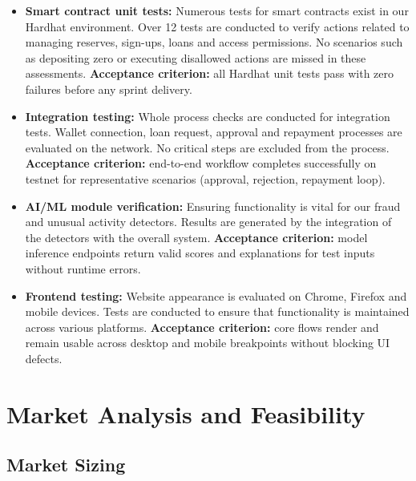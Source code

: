 \documentclass[12pt,a4paper]{report}
\begin{document}
\begin{itemize}[noitemsep]
\item \textbf{Smart contract unit tests:} Numerous tests for smart contracts exist in our Hardhat environment. Over 12 tests are conducted to verify actions related to managing reserves, sign-ups, loans and access permissions. No scenarios such as depositing zero or executing disallowed actions are missed in these assessments. \textbf{Acceptance criterion:} all Hardhat unit tests pass with zero failures before any sprint delivery.
\item \textbf{Integration testing:} Whole process checks are conducted for integration tests. Wallet connection, loan request, approval and repayment processes are evaluated on the network. No critical steps are excluded from the process. \textbf{Acceptance criterion:} end-to-end workflow completes successfully on testnet for representative scenarios (approval, rejection, repayment loop).
\item \textbf{AI/ML module verification:} Ensuring functionality is vital for our fraud and unusual activity detectors. Results are generated by the integration of the detectors with the overall system. \textbf{Acceptance criterion:} model inference endpoints return valid scores and explanations for test inputs without runtime errors.
\item \textbf{Frontend testing:} Website appearance is evaluated on Chrome, Firefox and mobile devices. Tests are conducted to ensure that functionality is maintained across various platforms. \textbf{Acceptance criterion:} core flows render and remain usable across desktop and mobile breakpoints without blocking UI defects.
\end{itemize}


\chapter{Market Analysis and Feasibility}

\section{Market Sizing}
\end{document}
